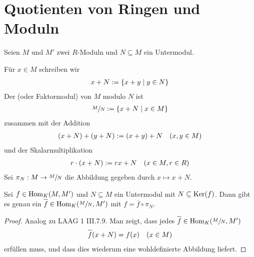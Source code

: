 \section{Quotienten von Ringen und Moduln}

Seien $M$ und $M'$ zwei $R$-Moduln und $N\subseteq M$ ein Untermodul.

\begin{definition}[Quotientenmodul]
	Für $x\in M$ schreiben wir
	\begin{align}
		x+N:=\{x+y\mid y\in N\}\notag
	\end{align}
	Der  (oder Faktormodul) von $M$ modulo $N$ ist
	\begin{align}
		\sfrac{M}{N}:=\{x+N\mid x\in M\}\notag
	\end{align}
	zusammen mit der Addition
	\begin{align}
		(x+N)+(y+N):=(x+y)+N\quad (x,y\in M)\notag
	\end{align}
	und der Skalarmultiplikation
	\begin{align}
		r\cdot (x+N) := rx+N\quad (x\in M,r\in R)\notag
	\end{align}
	Sei $\pi_N:M\to \sfrac{M}{N}$ die Abbildung gegeben durch $x\mapsto x+N$.
\end{definition}

\begin{proposition}
	Sei $f\in\operatorname{Hom}_K(M,M')$ und $N\subseteq M$ ein Untermodul mit $N\subseteq \operatorname{Ker}(f)$. Dann gibt es genau ein $\overline{f}\in\Hom_K(\qraum{M}{N},M')$ mit $f=\overline{f}\circ \pi_N$.
	\begin{center}
	\end{center}
\end{proposition}
\begin{proof}
	Analog zu LAAG 1 III.7.9. Man zeigt, dass jedes $\overline{f}\in\Hom_K(\qraum{M}{N},M')$
	\begin{align}
		\overline{f}(x+N)=f(x)\quad (x\in M)\notag
	\end{align}
	erfüllen muss, und dass dies wiederum eine wohldefinierte Abbildung liefert. %
\end{proof}

